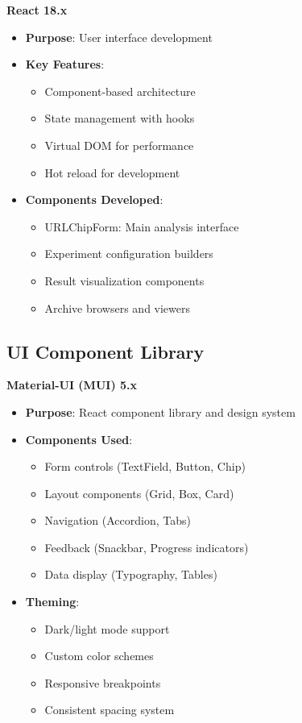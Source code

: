 \textbf{React 18.x}
\begin{itemize}
    \item \textbf{Purpose}: User interface development
    \item \textbf{Key Features}:
        \begin{itemize}
            \item Component-based architecture
            \item State management with hooks
            \item Virtual DOM for performance
            \item Hot reload for development
        \end{itemize}
    \item \textbf{Components Developed}:
        \begin{itemize}
            \item URLChipForm: Main analysis interface
            \item Experiment configuration builders
            \item Result visualization components
            \item Archive browsers and viewers
        \end{itemize}
\end{itemize}

\subsection{UI Component Library}
\label{subsec:material-ui}

\textbf{Material-UI (MUI) 5.x}
\begin{itemize}
    \item \textbf{Purpose}: React component library and design system
    \item \textbf{Components Used}:
        \begin{itemize}
            \item Form controls (TextField, Button, Chip)
            \item Layout components (Grid, Box, Card)
            \item Navigation (Accordion, Tabs)
            \item Feedback (Snackbar, Progress indicators)
            \item Data display (Typography, Tables)
        \end{itemize}
    \item \textbf{Theming}:
        \begin{itemize}
            \item Dark/light mode support
            \item Custom color schemes
            \item Responsive breakpoints
            \item Consistent spacing system
        \end{itemize}
\end{itemize}

